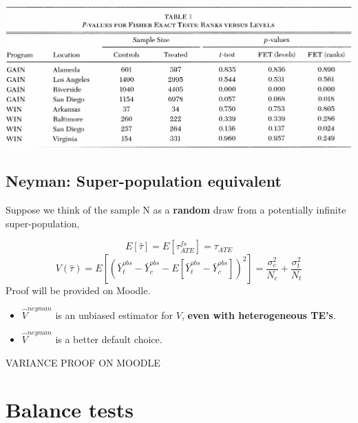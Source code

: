 \documentclass[
  letterpaper,
  DIV=11,
  numbers=noendperiod]{scrreprt}
\providecommand{\tightlist}{%
  \setlength{\itemsep}{0pt}\setlength{\parskip}{0pt}}\usepackage{longtable,booktabs,array}
\theoremstyle{definition}
\theoremstyle{remark}
\begin{document}
\includegraphics{Images/table1_imbenswooldridge2009.png}

\subsection{Neyman: Super-population
equivalent}\label{neyman-super-population-equivalent}

Suppose we think of the sample N as a \textbf{random} draw from a
potentially infinite super-population,

\begin{tcolorbox}[enhanced jigsaw, bottomrule=.15mm, coltitle=black, arc=.35mm, left=2mm, opacityback=0, leftrule=.75mm, colbacktitle=quarto-callout-important-color!10!white, title={Result}, toprule=.15mm, bottomtitle=1mm, breakable, colframe=quarto-callout-important-color-frame, opacitybacktitle=0.6, titlerule=0mm, colback=white, rightrule=.15mm, toptitle=1mm]

\[
                E[\hat{\tau}] = E[\tau^{fs}_{ATE}] = \tau_{ATE}
\] \[
                V(\hat{\tau}) = E\left[(\bar{Y}^{obs}_t-\bar{Y}^{obs}_c-E[\bar{Y}^{obs}_t-\bar{Y}^{obs}_c])^2\right]= \frac{\sigma^2_c}{N_c}+\frac{\sigma^2_t}{N_t}
\] Proof will be provided on Moodle.

\end{tcolorbox}

\begin{itemize}
\tightlist
\item
  \(\hat{V}^{neyman}\) is an unbiased estimator for \(V\), \textbf{even
  with heterogeneous TE's}.
\item
  \(\hat{V}^{neyman}\) is a better default choice.
\end{itemize}

VARIANCE PROOF ON MOODLE

\section{Balance tests}\label{balance-tests}
\end{document}
